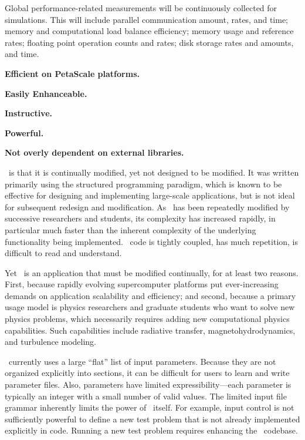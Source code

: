 \documentclass{article}
\begin{document}

%
   Global performance-related measurements will be continuously
   collected for simulations.  This will include parallel
   communication amount, rates, and time; memory and computational
   load balance efficiency; memory usage and reference rates; floating
   point operation counts and rates; disk storage rates and amounts,
   and time.

    \textbf{Efficient on PetaScale platforms.}

    \textbf{Easily Enhanceable.}

    \textbf{Instructive.}  

    \textbf{Powerful.}

    \textbf{Not overly dependent on external libraries.}

    \enzo\ is that it is continually modified, yet not designed to be
    modified.  It was written primarily using the structured
    programming paradigm, which is known to be effective for designing
    and implementing large-scale applications, but is not ideal for
    subsequent redesign and modification.  As \enzo\ has been
    repeatedly modified by successive researchers and students, its
    complexity has increased rapidly, in particular much faster than
    the inherent complexity of the underlying functionality being
    implemented.
%
    \enzo\ code is tightly coupled, has much repetition, is difficult
    to read and understand.

    Yet \enzo\ is an application that must be modified continually,
    for at least two reasons.  First, because rapidly evolving
    supercomputer platforms put ever-increasing demands on application
    scalability and efficiency; and second, because a primary usage
    model is physics researchers and graduate students who want to
    solve new physics problems, which necessarily requires adding new
    computational physics capabilities.  Such capabilities include
    radiative transfer, magnetohydrodynamics, and turbulence modeling.

% 
    \enzo\ currently uses a large ``flat'' list of input parameters.
    Because they are not organized explicitly into sections, it can be
    difficult for users to learn and write parameter files.
%
    Also, parameters have limited expressibility---each parameter is
    typically an integer with a small number of valid values.
%
    The limited input file grammar inherently limits the power of
    \enzo\ itself.  For example, input control is not sufficiently
    powerful to define a new test problem that is not already
    implemented explicitly in code.  Running a new test problem
    requires enhancing the \enzo\ codebase.
\end{document}
